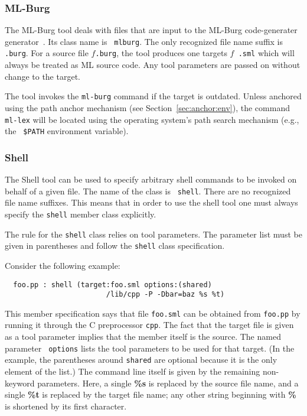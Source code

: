 \documentclass[titlepage,letterpaper]{article}
\begin{document}
\subsubsection*{ML-Burg}

The ML-Burg tool deals with files that are input to the ML-Burg
code-generater generator~\cite{mlburg93}.  Its class name is {\tt
mlburg}.  The only recognized file name suffix is {\tt .burg}.  For a
source file $f${\tt .burg}, the tool produces one targets $f${\tt
.sml} which will always be treated as ML source code.  Any tool
parameters are passed on without change to the target.

The tool invokes the {\tt ml-burg} command if the target is outdated.
Unless anchored using the path anchor mechanism (see
Section~\ref{sec:anchor:env}), the command {\tt ml-lex} will be located
using the operating system's path search mechanism (e.g., the {\tt
\$PATH} environment variable).

\subsubsection*{Shell}

The Shell tool can be used to specify arbitrary shell commands to be
invoked on behalf of a given file.  The name of the class is {\tt
shell}.  There are no recognized file name suffixes.  This means that
in order to use the shell tool one must always specify the {\tt shell}
member class explicitly.

The rule for the {\tt shell} class relies on tool parameters.  The
parameter list must be given in parentheses and follow the {\tt shell}
class specification.

Consider the following example:

\begin{verbatim}
  foo.pp : shell (target:foo.sml options:(shared)
                        /lib/cpp -P -Dbar=baz %s %t)
\end{verbatim}

This member specification says that file {\tt foo.sml} can be obtained
from {\tt foo.pp} by running it through the C preprocessor {\tt cpp}.
The fact that the target file is given as a tool parameter implies
that the member itself is the source.  The named parameter {\tt
options} lists the tool parameters to be used for that target. (In the
example, the parentheses around {\tt shared} are optional because it
is the only element of the list.) The command line itself is given by
the remaining non-keyword parameters.  Here, a single {\bf \%s} is
replaced by the source file name, and a single {\bf \%t} is replaced
by the target file name; any other string beginning with {\bf \%} is
shortened by its first character.
\end{document}
